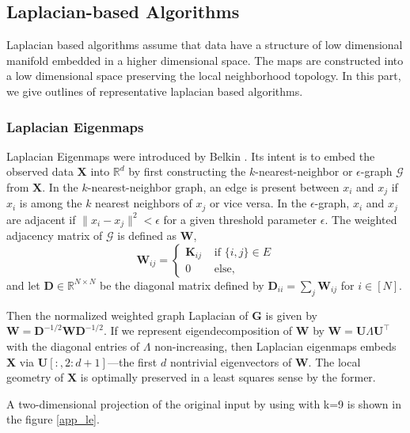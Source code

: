 \subsection{Laplacian-based Algorithms}
Laplacian based algorithms assume that data have a structure of low dimensional manifold embedded in a higher dimensional space. The maps are constructed into a low dimensional space preserving the local neighborhood topology. In this part, we give outlines of representative laplacian based algorithms.

\subsubsection{Laplacian Eigenmaps}
\label{s:le}
Laplacian Eigenmaps were introduced by Belkin \citep{Bel2002}. Its intent is
to embed the observed data $\mathbf{X}$ into $\mathbb{R}^d$ by first constructing the $k$-nearest-neighbor or $\epsilon$-graph $\mathcal{G}$ from $\mathbf{X}$. In the $k$-nearest-neighbor graph, an edge is present between $x_i$ and $x_j$ if $x_i$ is among the $k$ nearest neighbors of $x_j$ or vice versa. In the $\epsilon$-graph, $x_i$ and $x_j$ are adjacent if $\|x_i-x_j\|^2<\epsilon$ for a given threshold parameter $\epsilon$. The weighted adjacency matrix of $\mathcal{G}$ is defined as $\mathbf{W}$, $$\mathbf{W}_{ij}=\begin{cases} \mathbf{K}_{ij} &\mbox{ if } \{i,j\}\in E\\
                0 &\mbox{ else}, \end{cases}$$ and let $\mathbf{D}\in\mathbb{R}^{N\times N}$ be the diagonal matrix defined by $\mathbf{D}_{ii}=\sum_{j}\mathbf{W}_{ij}$ for $i\in[N]$.
                
Then the normalized weighted graph Laplacian of $\mathbf{G}$ \citep{Bel2002}
is given by $\mathbf{W}=\mathbf{D}^{-1/2}\mathbf{W}\mathbf{D}^{-1/2}$.
If we represent eigendecomposition of $\mathbf{W}$  by $\mathbf{W}=\mathbf{U}\Lambda \mathbf{U}^\top$ with the diagonal entries of $\Lambda$ non-increasing, then Laplacian eigenmaps embeds $\mathbf{X}$ via
$\mathbf{U}[:,2:d+1]$---the first $d$ nontrivial eigenvectors of $\mathbf{W}$. The local geometry of $\mathbf{X}$ is optimally preserved in a least squares sense by the former.
 
A two-dimensional projection of the original input by using with k=9 is shown in the figure \ref{app_le}.
 
